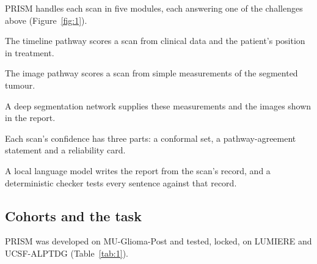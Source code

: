 \documentclass[largeformat]{interact} %
\begin{document}
PRISM handles each scan in five modules, each answering one of the challenges above (Figure~\ref{fig:1}).

The timeline pathway scores a scan from clinical data and the patient's position in treatment.

The image pathway scores a scan from simple measurements of the segmented tumour.

A deep segmentation network supplies these measurements and the images shown in the report.

Each scan's confidence has three parts: a conformal set, a pathway-agreement statement and a reliability card.

A local language model writes the report from the scan's record, and a deterministic checker tests every sentence
against that record.

\subsection{Cohorts and the task}\label{sec:2.2}

PRISM was developed on MU-Glioma-Post and tested, locked, on LUMIERE and UCSF-ALPTDG (Table~\ref{tab:1}).
\end{document}

